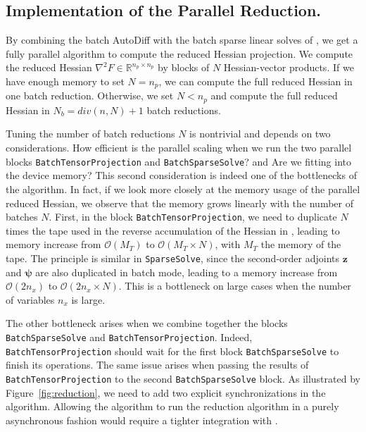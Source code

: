 \subsection{Implementation of the Parallel Reduction.}
\label{sec:implementation:parallel}

By combining  the batch AutoDiff with the batch sparse linear
solves of \cusolverrf, we  get a fully parallel algorithm to
compute the reduced Hessian projection. We compute the reduced
Hessian $\nabla^2 F \in \mathbb{R}^{n_p \times n_p}$ by blocks of $N$ Hessian-vector products.
If we have enough memory to set $N = n_p$, we can compute the full reduced
Hessian in one batch reduction. Otherwise, we set $N < n_p$ and compute
the full reduced Hessian in $N_b = div(n, N) + 1$ batch reductions.

Tuning the number of batch reductions $N$ is nontrivial and depends on
two considerations.
How efficient is the parallel scaling when we run the two parallel blocks {\tt BatchTensorProjection} and {\tt BatchSparseSolve}? and
 Are we fitting into the device memory?
This second consideration is indeed one of the bottlenecks of the algorithm.
In fact, if we look more closely at the memory usage of the parallel
reduced Hessian, we observe that the memory grows linearly with the number
of batches $N$. First, in the block {\tt BatchTensorProjection}, we need to duplicate $N$ times the
tape used in the reverse accumulation of the Hessian in ,
leading to memory increase from $\mathcal{O}(M_T)$ to $\mathcal{O}(M_T \times N)$, with $M_T$ the memory of the tape.
The principle is similar in {\tt SparseSolve}, since the second-order
adjoints $\bm{z}$ and $\bm{\psi}$ are also duplicated in batch mode,
leading to a memory increase from $\mathcal{O}(2 n_x)$ to $\mathcal{O}(2 n_x  \times N)$.
This is a bottleneck on large cases when the number of variables $n_x$
is large.

The other bottleneck arises when we combine together the blocks {\tt BatchSparseSolve}
and {\tt BatchTensorProjection}. Indeed, {\tt BatchTensorProjection} should wait for the first
block {\tt BatchSparseSolve} to finish its operations. The same
issue arises when passing the results of {\tt BatchTensorProjection} to the second
{\tt BatchSparseSolve} block. As illustrated by Figure~\ref{fig:reduction},
we need to add two explicit synchronizations in the algorithm.
Allowing the algorithm to run the reduction algorithm in a purely asynchronous
fashion would require a tighter integration with \cusolverrf.
